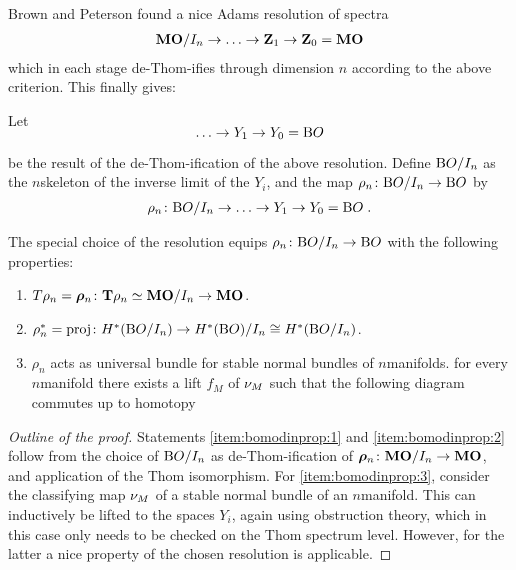 Brown and Peterson found a nice Adams resolution of spectra
\begin{gather*}
  \bm{\mathrm{MO}}/I_{n} \to\dotsc \to \bm{\mathrm{Z}}_1 \to \bm{\mathrm{Z}}_0 = \bm{\mathrm{MO}}
\end{gather*}
which in each stage de-Thom-ifies through dimension $n$ according to
the above criterion.
This finally gives:
\begin{Def}
  Let
  \begin{gather*}
    \SwapAboveDisplaySkip
    \dotsc \to Y_1 \to Y_0 = \BO
 \end{gather*}
  be the result of the de-Thom-ification of the above resolution.
  Define $\mathrm{B}O/I_{n}$ as the $n$\nbd{}skeleton of the inverse limit of the
  $Y_i$, and the map $\rho_n\colon\mathrm{B}O/I_{n}\to\mathrm{B}O$ by
  \begin{gather*}
    \rho_n\colon\mathrm{B}O/I_{n}\to\dotsc\to Y_1\to Y_0=\mathrm{B}O
    \;.
  \end{gather*}
\end{Def}

\begin{Thm*}
  The special choice of the resolution equips
  $\rho_n\colon\mathrm{B}O/I_{n}\to\mathrm{B}O$ with the following properties:
  \begin{enumerate}
  \item\label{item:bomodinprop:1}
    $T{\rho_n} = \bm{\rho}_n\colon \bm{\mathrm{T}}{\rho_n}\simeq\bm{\mathrm{MO}}/I_{n}\to\bm{\mathrm{MO}}$.
  \item\label{item:bomodinprop:2}
    ${\rho}^*_n=\mathrm{proj}\colon
    H^*(\mathrm{B}O/I_{n}) \to H^*(\mathrm{B}O)/I_{n}\cong H^*(\mathrm{B}O/I_{n})$.
  \item\label{item:bomodinprop:3}
    $\rho_n$ acts as universal bundle for stable normal bundles of
    $n$\nbd{}manifolds.
    \Idest for every $n$\nbd{}manifold there exists a lift $f_M$ of
    $\nu_{M}$ 
    such that the following diagram commutes up to homotopy
    \begin{center}
    \end{center}
  \end{enumerate}
  \begin{proof}[Outline of the proof]
    Statements \ref{item:bomodinprop:1} and \ref{item:bomodinprop:2}
    follow from the choice of $\mathrm{B}O/I_{n}$ as de-Thom-ification of
    $\bm{\rho}_n\colon\bm{\mathrm{MO}}/I_{n}\to\bm{\mathrm{MO}}$, and application of the Thom
    isomorphism.
    For \ref{item:bomodinprop:3}, consider the classifying map $\nu_{M}$
    of a stable normal bundle of an $n$\nbd{}manifold. This can inductively
    be lifted to the spaces $Y_i$, again
    using obstruction theory,
    which in this case only needs to be checked on the Thom spectrum
    level. However, for the latter a nice property of the chosen
    resolution is applicable.
  \end{proof}
\end{Thm*}


